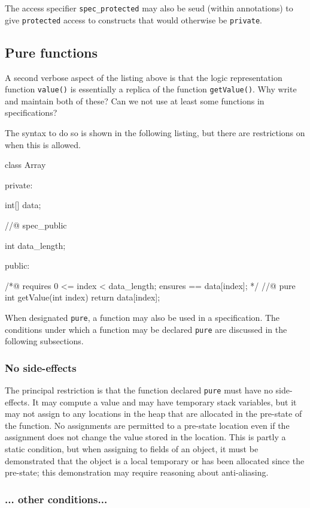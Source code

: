 The access specifier \lstinline|spec_protected| may also be seud (within \NAME{} annotations) to give \lang{} \lstinline|protected| access to \lang{} constructs
that would otherwise be \lstinline|private|.

\subsection{Pure functions}
A second verbose aspect of the listing above is that the logic representation function \lstinline|value()| is essentially a replica of
the \lang{} function \lstinline|getValue()|. Why write and maintain both of these? Can we not use at least some \lang{} functions in 
specifications?

The syntax to do so is shown in the following listing, but there are restrictions on when this is allowed.

\begin{listing-nonumber}
class Array {
	
  private:
	
    int[] data;
	
  //@ spec_public
	
    int data_length;
	
  public:
	
    /*@ 
      requires 0 <= index < data_length;
      ensures \result == data[index];
    */
    //@ pure
    int getValue(int index) {
		return data[index];
    }	
}
\end{listing-nonumber}

When designated \lstinline|pure|, a \lang{} function may also be used in a \NAME{} specification. The conditions under which a 
\lang{} function may be declared \lstinline|pure| are discussed in the following subsections.

\subsubsection{No side-effects}
The principal restriction is that the function declared \lstinline|pure| must have no side-effects. It may compute a value and may have 
temporary stack variables, but it may not assign to any locations in the heap that are allocated in the pre-state of the function.
No assignments are permitted to a pre-state location even if the assignment does not change the value stored in the location.
This is partly a static condition, but when assigning to fields of an object, it must be demonstrated that the object is a local temporary or
has been allocated since the pre-state; this demonstration may require reasoning about anti-aliasing.


\subsubsection{... other  conditions...}



